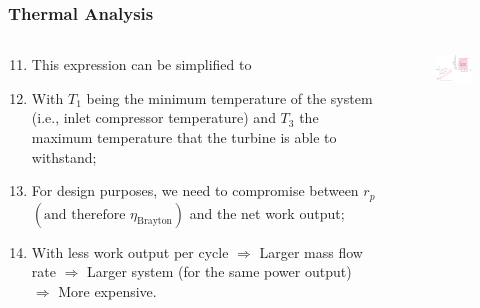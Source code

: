 \documentclass[10pt,compress]{beamer}
\newcommand{\frc}{\displaystyle\frac}
\begin{document}
\begin{frame}
 \frametitle{Thermal Analysis}
 \begin{columns}
  \begin{column}[c]{0.4\linewidth} 
    \begin{enumerate}[(1)]\setcounter{enumi}{10}\scriptsize
       \item<1-> This expression can be simplified to 
         \visible<1->{\begin{displaymath}
             r_{p}=\left(\frc{T_{3}}{T_{1}}\right)^{\frc{\gamma}{2\left(\gamma-1\right)}}
         \end{displaymath}}
       \item<2-> With $T_{1}$ being the minimum temperature of the system (i.e., inlet compressor temperature) and $T_{3}$ the maximum temperature that the turbine is able to withstand;
       \item<2-> For design purposes, we need to compromise between $r_{p}$ $\left(\text{and therefore }\eta_{\text{Brayton}}\right)$ and the net work output;
       \item<2-> With less work output per cycle $\Rightarrow$ Larger mass flow rate $\Rightarrow$ Larger system (for the same power output) $\Rightarrow$ More expensive.
    \end{enumerate}
  \end{column}
  \begin{column}[c]{0.6\linewidth}
    \begin{center}
   \begin{figure}%
     \includegraphics[height=6.cm,width=6.5cm,clip]{./Pics/Brayton_cycle2}
   \end{figure}  
    \end{center}
  \end{column}  
 \end{columns}
\end{frame}
\end{document}
